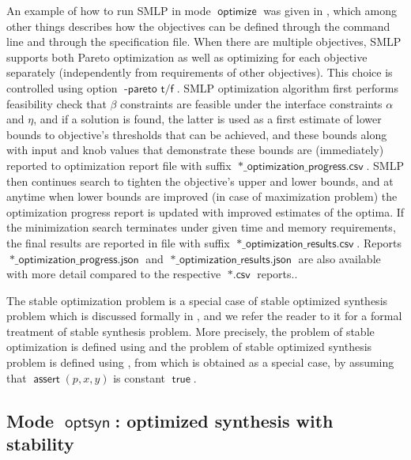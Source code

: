 \documentclass[a4paper,parskip=half]{article} %
\newcommand*\assert{\operatorname{\mathsf{assert}}}
\newcommand*\optionval[2]{\operatorname{\mathsf{#1}\,\,\mathsf{#2}}} %
\newcommand*\suffix[1]{\operatorname{\mathsf{#1}}} %
\newcommand*\mode[1]{\operatorname{\mathsf{#1}}} %
\newcommand*\operator[1]{\operatorname{\mathsf{{#1}}}} %
\begin{document}
An example of how to run SMLP in mode $\mode{optimize}$ was given in , which among other
things describes how the objectives can be defined through the command line and through the specification file.
When there are multiple objectives, SMLP supports both Pareto optimization as well as optimizing for each objective
separately (independently from requirements of other objectives). This choice is controlled using option 
$\optionval{-pareto}{t/f}$. SMLP optimization algorithm first performs feasibility check that $\beta$ constraints are 
feasible under the interface constraints $\alpha$ and $\eta$, and if a solution is found, the latter is used as a first
estimate of lower bounds to objective's thresholds that can be achieved, and these bounds along with input and knob
values that demonstrate these bounds are (immediately) reported to optimization report file  with suffix
$\suffix{*\_optimization\_progress.csv}$.  SMLP then continues search to tighten the objective's upper and lower bounds,
and at anytime when lower bounds are improved (in case of maximization problem) the optimization progress report
is updated with improved estimates of the optima. If the minimization search terminates under given time and memory
requirements, the final results are reported in file with suffix  $\suffix{*\_optimization\_results.csv}$. Reports
$\suffix{*\_optimization\_progress.json}$ and  $\suffix{*\_optimization\_results.json}$ are also available with 
more detail compared to the respective $\suffix{*.csv}$ reports.. 

The stable optimization problem is a special case of stable optimized synthesis problem which is discussed formally
in , and we refer the reader to it  for a formal treatment of stable synthesis problem. 
More precisely, the problem of stable optimization is defined using  and the 
problem of stable optimized synthesis problem is defined using , from which 
is obtained as a special case, by assuming that $\assert(p,x,y)$ is constant $\operator{true}$.


\subsection{Mode $\mode{optsyn}$: optimized synthesis with stability}\label{sec:stable:opt:synthesis}
\end{document}

